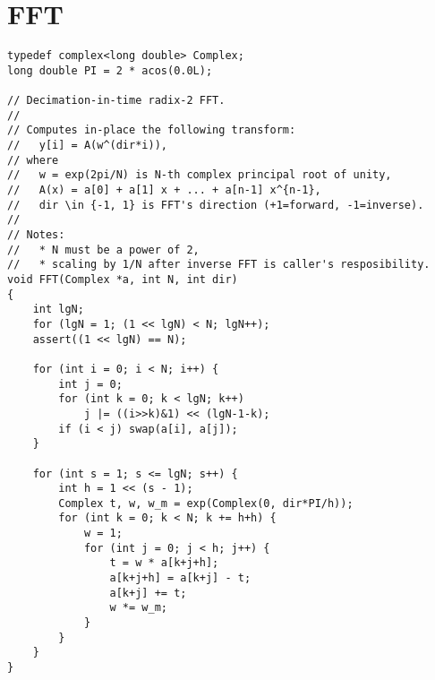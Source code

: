 \documentclass[a4paper, 12pt]{article}
\newcommand{\Section}[1]{
  \section*{#1}
  \addcontentsline{toc}{subsection}{#1}
  \vspace{-3mm}
}
\begin{document}
\Section{FFT}
\begin{Verbatim}[fontsize=\small]
typedef complex<long double> Complex;
long double PI = 2 * acos(0.0L);

// Decimation-in-time radix-2 FFT.
//
// Computes in-place the following transform:
//   y[i] = A(w^(dir*i)),
// where
//   w = exp(2pi/N) is N-th complex principal root of unity,
//   A(x) = a[0] + a[1] x + ... + a[n-1] x^{n-1},
//   dir \in {-1, 1} is FFT's direction (+1=forward, -1=inverse).
//
// Notes:
//   * N must be a power of 2,
//   * scaling by 1/N after inverse FFT is caller's resposibility.
void FFT(Complex *a, int N, int dir)
{
    int lgN;
    for (lgN = 1; (1 << lgN) < N; lgN++);
    assert((1 << lgN) == N);

    for (int i = 0; i < N; i++) {
        int j = 0;
        for (int k = 0; k < lgN; k++)
            j |= ((i>>k)&1) << (lgN-1-k);
        if (i < j) swap(a[i], a[j]);
    }

    for (int s = 1; s <= lgN; s++) {
        int h = 1 << (s - 1);
        Complex t, w, w_m = exp(Complex(0, dir*PI/h));
        for (int k = 0; k < N; k += h+h) {
            w = 1;
            for (int j = 0; j < h; j++) {
                t = w * a[k+j+h];
                a[k+j+h] = a[k+j] - t;
                a[k+j] += t;
                w *= w_m;
            }
        }
    }
}
\end{Verbatim}
\end{document}
